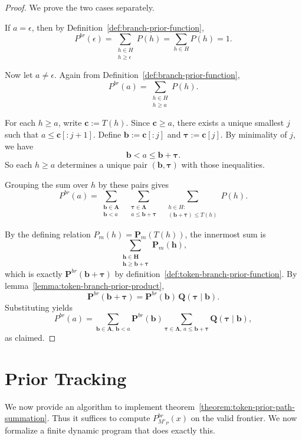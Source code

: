 \begin{proof}
    We prove the two cases separately.

    If $a=\epsilon$, then by Definition~\ref{def:branch-prior-function},
    $$
    P^{br}(\epsilon)=\sum_{\substack{h\in H\\ h\ge \epsilon}}P(h)=\sum_{h\in H}P(h)=1.
    $$

    Now let $a\neq\epsilon$. Again from Definition~\ref{def:branch-prior-function},
    $$
    P^{br}(a)=\sum_{\substack{h\in H\\ h\ge a}}P(h).
    $$

    For each $h\ge a$, write $\mathbf{c}:=T(h)$. Since $\mathbf{c}\ge a$,
    there exists a unique smallest $j$ such that
    $a\le \mathbf{c}[:j+1]$.
    Define $\mathbf{b}:=\mathbf{c}[:j]$ and $\boldsymbol{\tau}:=\mathbf{c}[j]$.
    By minimality of $j$, we have
    $$
    \mathbf{b}<a\le \mathbf{b}+\boldsymbol{\tau}.
    $$
    So each $h\ge a$ determines a unique pair $(\mathbf{b},\boldsymbol{\tau})$ with those inequalities.

    Grouping the sum over $h$ by these pairs gives
    $$
    P^{br}(a)=
    \sum_{\substack{\mathbf{b}\in\mathbf{A}\\\mathbf{b}<a}}
    \;\;
    \sum_{\substack{\boldsymbol{\tau}\in\mathbf{\Lambda}\\a\le \mathbf{b}+\boldsymbol{\tau}}}
    \;\;
    \sum_{\substack{h\in H:\\ (\mathbf{b}+\boldsymbol{\tau}) \leq T(h)}}
    P(h).
    $$

    By the defining relation $P_m(h)=\mathbf{P}_m(T(h))$, the innermost sum is
    \[
    \sum_{\substack{\mathbf{h}\in\mathbf{H}\\ \mathbf{h}\geq \mathbf{b}+\boldsymbol{\tau}}}
    \mathbf{P}_m(\mathbf{h}),
    \]
    which is exactly $\mathbf{P}^{br}(\mathbf{b}+\boldsymbol{\tau})$ by
    definition~\ref{def:token-branch-prior-function}. By
    lemma~\ref{lemma:token-branch-prior-product},
    $$
    \mathbf{P}^{br}(\mathbf{b}+\boldsymbol{\tau})
    =\mathbf{P}^{br}(\mathbf{b})\,\mathbf{Q}(\boldsymbol{\tau}\mid\mathbf{b}).
    $$
    Substituting yields
    $$
    P^{br}(a)=
    \sum_{\mathbf{b}\in\mathbf{A},\,\mathbf{b}<a}\mathbf{P}^{br}(\mathbf{b})
    \sum_{\boldsymbol{\tau}\in\mathbf{\Lambda},\,a\le \mathbf{b}+\boldsymbol{\tau}}\mathbf{Q}(\boldsymbol{\tau}\mid\mathbf{b}),
    $$
    as claimed.
\end{proof}


\section{Prior Tracking}
\label{sec:prior-tracking}
We now provide an algorithm to implement theorem~\ref{theorem:token-prior-path-summation}.
Thus it suffices to compute $P^{br}_{M'_P}(x)$ on the valid frontier.
We now formalize a finite dynamic program that does exactly this.

